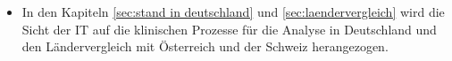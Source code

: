 	\begin{itemize}
	\item In den Kapiteln \ref{sec:stand in deutschland} und \ref{sec:laendervergleich} wird die Sicht der IT auf die klinischen Prozesse für die Analyse in Deutschland und den Ländervergleich mit Österreich und der Schweiz herangezogen.
	\end{itemize}
